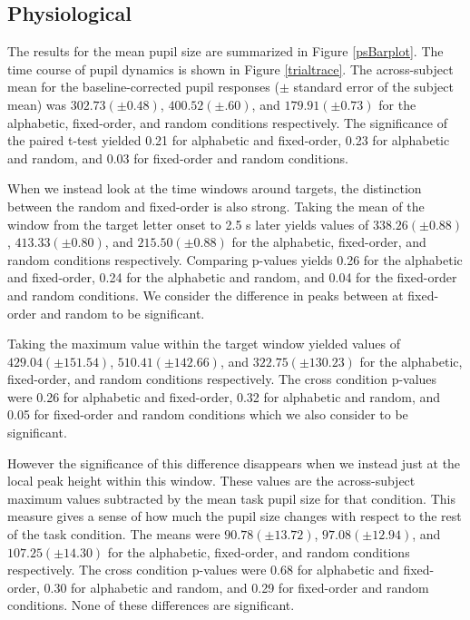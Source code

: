 \documentclass[10pt]{article}
\begin{document}
\subsection{Physiological}

The results for the mean pupil size are summarized in Figure
\ref{psBarplot}. The time course of pupil dynamics is shown in
Figure \ref{trialtrace}.  The across-subject mean for the
baseline-corrected pupil responses ($\pm$ standard error of
the subject mean) was $ 302.73 (\pm 0.48)$, $400.52 (\pm
.60)$, and $179.91 (\pm 0.73)$ for the alphabetic,
fixed-order, and random conditions respectively.  The
significance of the paired t-test yielded 0.21 for alphabetic
and fixed-order, 0.23 for alphabetic and random, and 0.03 for
fixed-order and random conditions.

When we instead look at the time windows around targets, the
distinction between the random and fixed-order is also strong.
Taking the mean of the window from the target letter onset to
2.5 s later yields values of $338.26 (\pm 0.88)$, $413.33 (\pm
0.80)$, and $215.50 (\pm 0.88)$ for the alphabetic,
fixed-order, and random conditions respectively.  Comparing
p-values yields 0.26 for the alphabetic and fixed-order, 0.24
for the alphabetic and random, and 0.04 for the fixed-order
and random conditions.  We consider the difference in peaks
between at fixed-order and random to be significant.

Taking the maximum value within the target window 
yielded  values of $429.04 (\pm 151.54)$, $510.41 (\pm
142.66)$, and $322.75 (\pm 130.23)$ for the alphabetic,
fixed-order, and random conditions respectively.  The cross
condition p-values were 0.26 for alphabetic and fixed-order,
0.32 for alphabetic and random, and 0.05 for fixed-order and
random conditions which we also consider to be significant.

However the significance of this difference disappears when we
instead just at the local peak height within this window.
These values are the across-subject maximum values subtracted
by the mean task pupil size for that condition.  This measure
gives a sense of how much the pupil size changes with respect
to the rest of the task condition. The means were $90.78 (\pm
13.72)$, $97.08 (\pm 12.94)$, and $107.25 (\pm 14.30)$ for the
alphabetic, fixed-order, and random conditions respectively.
The cross condition p-values were 0.68 for alphabetic and
fixed-order, 0.30 for alphabetic and random, and 0.29 for
fixed-order and random conditions.  None of these differences
are significant.
\end{document}
